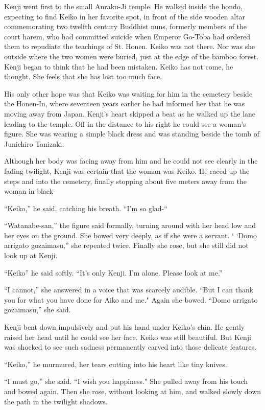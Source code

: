\documentclass[]{article}
\begin{document}
{Kenji went first to the small Anraku-Ji temple.  He walked inside the hondo, expecting to find Keiko in her favorite spot, in front of the side wooden altar commemorating two twelfth century Buddhist nuns, formerly members of the court harem, who had committed suicide when Emperor Go-Toba had ordered them to repudiate the teachings of St.  Honen.  Keiko was not there.  Nor was she outside where the two women were buried, just at the edge of the bamboo forest.  Kenji began to think that he had been mistaken.  Keiko has not come, he thought.  She feels that she has lost too much face.

His only other hope was that Keiko was waiting for him in the cemetery beside the Honen-In, where seventeen years earlier he had informed her that he was moving away from Japan.  Kenji’s heart skipped a beat as he walked up the lane leading to the temple.  Off in the distance to his right he could see a woman’s figure.  She was wearing a simple black dress and was standing beside the tomb of Junichiro Tanizaki.

Although her body was facing away from him and he could not see clearly in the fading twilight, Kenji was certain that the woman was Keiko.  He raced up the steps and into the cemetery, finally stopping about five meters away from the woman in black-

“Keiko,” he said, catching his breath.  “I’m so glad-“

“Watanabe-san,” the figure said formally, turning around with her head low and her eyes on the ground.  She bowed very deeply, as if she were a servant.  ‘ ‘Domo arrigato gozaimasu,” she repeated twice.  Finally she rose, but she still did not look up at Kenji.

“Keiko” he said softly.  “It’s only Kenji.  I’m alone.  Please look at me.”

“I cannot,” she answered in a voice that was scarcely audible.  “But I can thank you for what you have done for Aiko and me."  Again she bowed.  “Domo arrigato gozaimasu,” she said.

Kenji bent down impulsively and put his hand under Keiko’s chin.  He gently raised her head until he could see her face.  Keiko was still beautiful.  But Kenji was shocked to see such sadness permanently carved into those delicate features.

“Keiko,” he murmured, her tears cutting into his heart like tiny knives.

“I must go,” she said.  “I wish you happiness."  She pulled away from his touch and bowed again.  Then she rose, without looking at him, and walked slowly down the path in the twilight shadows.

}
\end{document}
